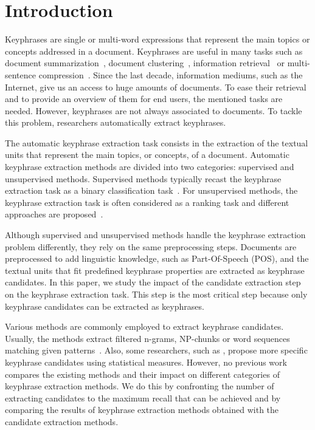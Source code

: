 \section{Introduction}
\label{sec:section}
  Keyphrases are single or multi-word expressions that represent the main topics
  or concepts addressed in a document. Keyphrases are useful in many tasks such
  as document summarization~\cite{avanzo2005keyphrase}, document
  clustering~\cite{han2007webdocumentclustering}, information
  retrieval~\cite{medelyan2008smalltrainingset} or multi-sentence
  compression~\cite{boudin2013multisentencecompression}.
  Since the last decade, information mediums, such as the Internet, give us an
  access to huge amounts of documents. To ease their retrieval and to provide an
  overview of them for end users, the mentioned tasks are needed. However,
  keyphrases are not always associated to documents. To tackle this problem,
  researchers automatically extract keyphrases.

  The automatic keyphrase extraction task consists in the extraction of the
  textual units that represent the main topics, or concepts, of a document.
  Automatic keyphrase extraction methods are divided into two
  categories: supervised and unsupervised methods. Supervised methods typically
  recast the keyphrase extraction task as a binary classification
  task~\cite{witten1999kea}. For unsupervised methods, the keyphrase extraction
  task is often considered as a ranking task and different approaches are
  proposed~\cite{hassan2010conundrums}.

  Although supervised and unsupervised methods handle the keyphrase extraction
  problem differently, they rely on the same preprocessing steps. Documents are
  preprocessed to add linguistic knowledge, such as Part-Of-Speech (POS), and
  the textual units that fit predefined keyphrase properties are extracted as
  keyphrase candidates. In this paper, we study the impact of the candidate
  extraction step on the keyphrase extraction task. This step is the most
  critical step because only keyphrase candidates can be extracted as
  keyphrases.

  Various methods are commonly employed to extract keyphrase candidates.
  Usually, the methods extract filtered n-grams, NP-chunks or word sequences
  matching given patterns~\cite{hulth2003keywordextraction}. Also, some
  researchers, such as ,
  propose more specific keyphrase candidates using statistical measures.
  However, no previous work compares the existing methods and their impact on
  different categories of keyphrase extraction methods. We do this by
  confronting the number of extracting candidates to the maximum recall that
  can be achieved and by comparing the results of keyphrase extraction methods
  obtained with the candidate extraction methods.


